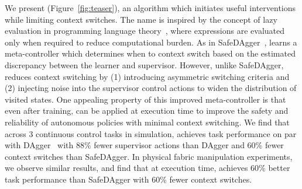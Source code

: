 We present \algname (Figure~\ref{fig:teaser}), an algorithm which initiates useful interventions while limiting context switches.
The name \algname is inspired by the concept of lazy evaluation in programming language theory~\cite{lazy-eval}, where expressions are evaluated only when required to reduce computational burden. As in SafeDAgger~\cite{safe_dagger}, \algname learns a meta-controller which determines when to context switch based on the estimated discrepancy between the learner and supervisor. However, unlike SafeDAgger, \algname reduces context switching by (1) introducing asymmetric switching criteria and (2) injecting noise into the supervisor control actions to widen the distribution of visited states. One appealing property of this improved meta-controller is that even after training, \algname can be applied at execution time to improve the safety and reliability of autonomous policies with minimal context switching.
We find that across 3 continuous control tasks in simulation, \algname achieves task performance on par with DAgger~\cite{dagger} with 88\% fewer supervisor actions than DAgger and 60\% fewer context switches than SafeDAgger. In physical fabric manipulation experiments, we observe similar results, and find that at execution time, \algname achieves 60\% better task performance than SafeDAgger with 60\% fewer context switches. %







